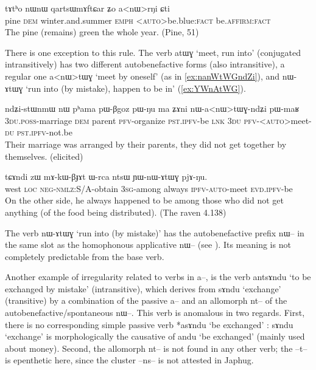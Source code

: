 \documentclass[oldfontcommands,oneside,a4paper,11pt]{article}
\newcommand{\ipa}[1]{{\phon \mbox{#1}}} %
\begin{document}
\begin{exe}
\ex \label{ex:anWrŋi}
\gll 
\ipa{tɤtʰo}  	\ipa{nɯnɯ}  	\ipa{qartsɯmɤftɕar}  	\ipa{ʑo}  	\ipa{a<nɯ>rŋi}  	\ipa{ɕti}  \\
pine \textsc{dem} winter.and.summer \textsc{emph} <\textsc{auto}>be.blue:\textsc{fact} be.\textsc{affirm:fact} \\
\glt The pine (remains) green the whole year. (Pine, 51)
\end{exe}
 
 
 There is one exception to this rule. The verb \ipa{atɯɣ} `meet, run into' (conjugated intransitively) has two different autobenefactive forms (also intransitive), a regular one \ipa{a<nɯ>tɯɣ} `meet by oneself' (as in \ref{ex:nanWtWGndZi}), and  \ipa{nɯ-ɤtɯɣ}  `run into (by mistake), happen to be in'   (\ref{ex:YWnAtWG}).
 
 \begin{exe}
\ex \label{ex:nanWtWGndZi}
\gll 
\ipa{ndʑi-stɯnmɯ}  	\ipa{nɯ}  	\ipa{pʰama}  	\ipa{pɯ-βgoz}  	\ipa{pɯ-ŋu}  	\ipa{ma}  	\ipa{ʑɤni}  	\ipa{nɯ-a<nɯ>tɯɣ-ndʑi}  	\ipa{pɯ-maʁ}  \\
\textsc{3du.poss}-marriage \textsc{dem} parent \textsc{pfv}-organize \textsc{pst.ipfv}-be \textsc{lnk} \textsc{3du} \textsc{pfv}-<\textsc{auto}>meet-\textsc{du}  \textsc{pst.ipfv}-not.be \\
\glt Their marriage was arranged by their parents, they did not get together by themselves. (elicited)
\end{exe}

 \begin{exe}
\ex \label{ex:YWnAtWG}
\gll 
\ipa{tɕɤndi}  	\ipa{zɯ}  	\ipa{mɤ-kɯ-βɟɤt}  	\ipa{ɯ-rca}  	\ipa{ntsɯ}  	\ipa{ɲɯ-nɯ-ɤtɯɣ}  	\ipa{pjɤ-ŋu.}  \\
west \textsc{loc} \textsc{neg-nmlz}:S/A-obtain \textsc{3sg}-among always \textsc{ipfv-auto}-meet \textsc{evd.ipfv}-be \\
\glt On the other side, he   always happened to be among those who did not get anything (of the food being distributed). (The raven 4.138)
\end{exe}

The verb \ipa{nɯ-ɤtɯɣ}  `run into (by mistake)'  has the autobenefactive prefix \ipa{nɯ--} in the same slot as the homophonous applicative \ipa{nɯ--} (see \citealt{jacques13tropative}). Its meaning   is not completely predictable from the base verb.

Another example of irregularity related to verbs in \ipa{a--}, is the verb \ipa{antsɤndu} `to be exchanged by mistake' (intransitive), which derives from   \ipa{sɤndu} `exchange' (transitive) by a combination of the passive \ipa{a--} and an allomorph \ipa{nt--} of the autobenefactive/spontaneous \ipa{nɯ--}. This verb is anomalous in two regards. First, there is no corresponding simple passive verb *\ipa{asɤndu} `be exchanged' : \ipa{sɤndu} `exchange' is morphologically the causative of \ipa{andu} `be exchanged' (mainly used about money). Second, the allomorph \ipa{nt--} is not found in any other verb; the \ipa{--t--} is epenthetic here, since the cluster \ipa{--ns--} is not attested in Japhug.
\end{document}
